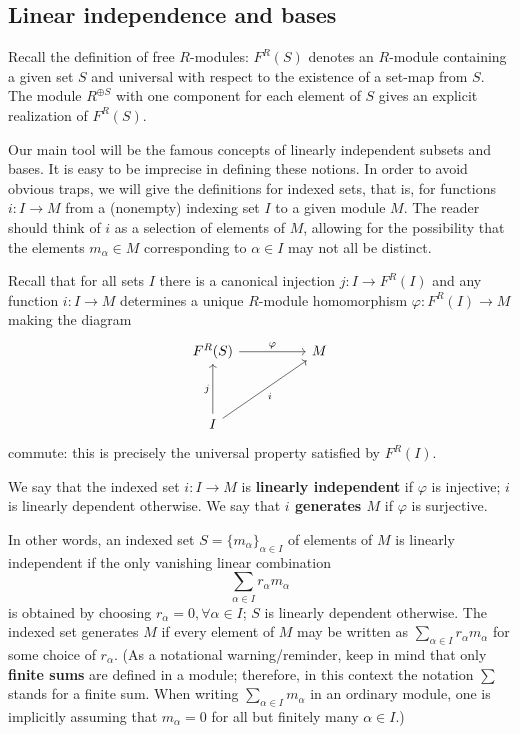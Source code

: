 \subsection{Linear independence and bases}
Recall the definition of free $R$-modules: $F^R(S)$ denotes an $R$-module containing a given set $S$ and universal with respect to the existence of a set-map from $S$. The module $R^{\oplus S}$ with one component for each element of $S$ gives an explicit realization of $F^R(S)$.\par
Our main tool will be the famous concepts of linearly independent subsets and bases. It is easy to be imprecise in defining these notions. In order to avoid obvious traps, we will give the definitions for indexed sets, that is, for functions $i:I\to M$ from a (nonempty) indexing set $I$ to a given module $M$. The reader should think of $i$ as a selection of elements of $M$, allowing for the possibility that the elements $m_\alpha\in M$ corresponding to $\alpha\in I$ may not all be distinct.\par
Recall that for all sets $I$ there is a canonical injection $j:I\to F^R(I)$ and any function $i:I\to M$ determines a unique $R$-module homomorphism $\varphi:F^R(I)\to M$ making the diagram
\[\begin{tikzcd}
F^R(S)\ar[rr,"\varphi"] && M\\
&&\\
I\ar[uu,"j"]\ar[rruu,swap,"i"]
\end{tikzcd}\]
commute: this is precisely the universal property satisfied by $F^R(I)$.
\begin{definition}
We say that the indexed set $i:I\to M$ is \textbf{linearly independent} if $\varphi$ is injective; $i$ is linearly dependent otherwise. We say that \textbf{$i$ generates $M$} if $\varphi$ is surjective.
\end{definition}
In other words, an indexed set $S=\{m_\alpha\}_{\alpha\in I}$ of elements of $M$ is linearly independent if the only vanishing linear combination
\[\sum_{\alpha\in I}r_\alpha m_\alpha\]
is obtained by choosing $r_\alpha=0,\forall \alpha\in I$; $S$ is linearly dependent otherwise. The
indexed set generates $M$ if every element of $M$ may be written as $\sum_{\alpha\in I}r_\alpha m_\alpha$ for some choice of $r_\alpha$. (As a notational warning/reminder, keep in mind that only \textbf{finite sums} are defined in a module; therefore, in this context the notation $\sum$ stands for a finite sum. When writing $\sum_{\alpha\in I}m_\alpha$ in an ordinary module, one is implicitly
assuming that $m_\alpha=0$ for all but finitely many $\alpha\in I$.)\par
